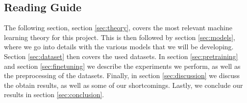\documentclass[./main.tex]{subfiles}
\begin{document}
\subsection{Reading Guide}
The following section, section \ref{sec:theory}, covers the most relevant machine learning theory for this project. This is then followed by section \ref{sec:models}, where we go into details with the various models that we will be developing. Section \ref{sec:dataset} then covers the used datasets. In section \ref{sec:pretraining} and section \ref{sec:finetuning} we describe the experiments we perform, as well as the preprocessing of the datasets. Finally, in section \ref{sec:discussion} we discuss the obtain results, as well as some of our shortcomings. Lastly, we conclude our results in section \ref{sec:conclusion}.
\end{document}
